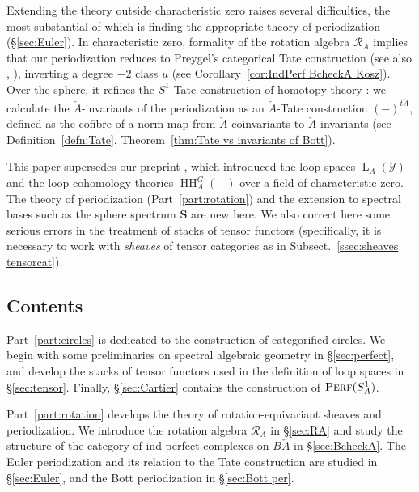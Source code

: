 \documentclass[12pt, oneside]{amsart}
\numberwithin{equation}{section}
\theoremstyle{remark}
\theoremstyle{plain}
\DeclareMathOperator{\Perf}{\textsc{Perf}}
\newcommand{\R}{\mathcal{R}}
\newcommand{\RA}{\R_A}
\newcommand{\Loop}{\operatorname{L}}
\newcommand{\YY}{\mathcal{Y}}
\newcommand{\HH}{\operatorname{HH}}
\begin{document}
Extending the theory outside characteristic zero raises several difficulties, the most substantial of which is finding the appropriate theory of periodization (\S\ref{sec:Euler}).
In characteristic zero, formality of the rotation algebra $\RA$ implies that our periodization reduces to Preygel's categorical Tate construction \cite[Def.~1.2.3]{Preygel} (see also \cite[Def.~2.7]{BNloop}, \cite[2.1.4]{BZNpotent}), inverting a degree $-2$ class $u$ (see Corollary~\ref{cor:IndPerf BcheckA Kosz}).
Over the sphere, it refines the $S^1$-Tate construction of homotopy theory \cite{GreenleesMay,NS}: we calculate the $\check{A}$-invariants of the periodization as an $\check{A}$-Tate construction $(-)^{t\check{A}}$, defined as the cofibre of a norm map from $\check{A}$-coinvariants to $\check{A}$-invariants (see Definition~\ref{defn:Tate}, Theorem~\ref{thm:Tate vs invariants of Bott}).

This paper supersedes our preprint \cite{ellhodge}, which introduced the loop spaces $\Loop_A(\YY)$ and the loop cohomology theories $\HH_A^G(-)$ over a field of characteristic zero.
The theory of periodization (Part~\ref{part:rotation}) and the extension to spectral bases such as the sphere spectrum $\mathbf{S}$ are new here.
We also correct here some serious errors in the treatment of stacks of tensor functors (specifically, it is necessary to work with \emph{sheaves} of tensor categories as in Subsect.~\ref{ssec:sheaves tensorcat}).

\subsection{Contents}\label{ssec:intro/contents}

Part~\ref{part:circles} is dedicated to the construction of categorified circles.
We begin with some preliminaries on spectral algebraic geometry in \S \ref{sec:perfect}, and develop the stacks of tensor functors used in the definition of loop spaces in \S \ref{sec:tensor}.
Finally, \S \ref{sec:Cartier} contains the construction of $\Perf(S^1_A)$.

Part~\ref{part:rotation} develops the theory of rotation-equivariant sheaves and periodization.
We introduce the rotation algebra $\RA$ in \S \ref{sec:RA} and study the structure of the category of ind-perfect complexes on $B\check{A}$ in \S \ref{sec:BcheckA}.
The Euler periodization and its relation to the Tate construction are studied in \S \ref{sec:Euler}, and the Bott periodization in \S \ref{sec:Bott per}.
\end{document}
